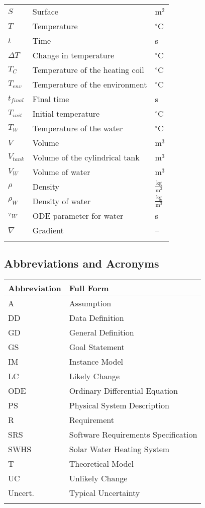 \documentclass[12pt]{article}
\begin{document}
\begin{longtabu}{l X[l] l}
\\
$S$ & Surface & $\text{m}^{2}$
\\
$T$ & Temperature & ${}^{\circ}$C
\\
$t$ & Time & s
\\
$ΔT$ & Change in temperature & ${}^{\circ}$C
\\
${T_{C}}$ & Temperature of the heating coil & ${}^{\circ}$C
\\
${T_{env}}$ & Temperature of the environment & ${}^{\circ}$C
\\
${t_{final}}$ & Final time & s
\\
${T_{init}}$ & Initial temperature & ${}^{\circ}$C
\\
${T_{W}}$ & Temperature of the water & ${}^{\circ}$C
\\
$V$ & Volume & $\text{m}^{3}$
\\
${V_{tank}}$ & Volume of the cylindrical tank & $\text{m}^{3}$
\\
${V_{W}}$ & Volume of water & $\text{m}^{3}$
\\
$ρ$ & Density & $\frac{\text{kg}}{\text{m}^{3}}$
\\
${ρ_{W}}$ & Density of water & $\frac{\text{kg}}{\text{m}^{3}}$
\\
${τ_{W}}$ & ODE parameter for water & s
\\
$∇$ & Gradient & --
\\
\bottomrule
\label{Table:ToS}
\end{longtabu}
\subsection{Abbreviations and Acronyms}
\label{Sec:TAbbAcc}
\begin{longtable*}{l l}
\toprule
Abbreviation & Full Form
\\
\midrule
A & Assumption
\\
DD & Data Definition
\\
GD & General Definition
\\
GS & Goal Statement
\\
IM & Instance Model
\\
LC & Likely Change
\\
ODE & Ordinary Differential Equation
\\
PS & Physical System Description
\\
R & Requirement
\\
SRS & Software Requirements Specification
\\
SWHS & Solar Water Heating System
\\
T & Theoretical Model
\\
UC & Unlikely Change
\\
Uncert. & Typical Uncertainty
\\
\bottomrule
\label{Table:TAbbAcc}
\end{longtable*}
\end{document}

